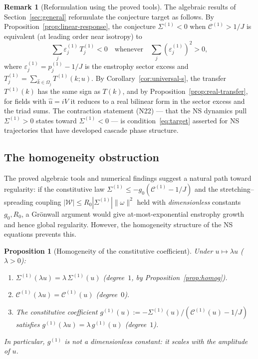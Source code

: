 \documentclass[11pt]{article}
\newtheorem{proposition}[theorem]{Proposition}
\theoremstyle{definition}
\newtheorem{remark}[theorem]{Remark}
\newcommand{\cC}{\mathcal{C}}
\begin{document}
\begin{remark}[Reformulation using the proved tools]
\label{rem:reformulation}
The algebraic results of Section~\ref{sec:general}
reformulate the conjecture target as follows.
By Proposition~\ref{prop:linear-response}, the
conjecture $\Sigma^{(1)}<0$ when $\cC^{(1)}>1/J$
is equivalent (at leading order near isotropy) to
\begin{equation}\label{eq:target}
\sum_j \varepsilon_j^{(1)}\, T_j^{(1)} < 0
\quad\text{whenever}\quad
\sum_j (\varepsilon_j^{(1)})^2 > 0,
\end{equation}
where $\varepsilon_j^{(1)} = p_j^{(1)}-1/J$ is
the enstrophy sector excess and
$T_j^{(1)} = \sum_{\hat k\in\Omega_j}
T^{(1)}(k;u)$.  By
Corollary~\ref{cor:universal-s}, the transfer
$T^{(1)}(k)$ has the same sign as $T(k)$, and
by Proposition~\ref{prop:real-transfer}, for
fields with $\hat u=iV$ it reduces to a real
bilinear form in the sector excess and the
triad sums.  The contraction statement (N22) ---
that the NS dynamics pull $\Sigma^{(1)}>0$ states
toward $\Sigma^{(1)}<0$ --- is
condition~\eqref{eq:target} asserted for NS
trajectories that have developed cascade phase
structure.
\end{remark}

\subsection{The homogeneity obstruction}
\label{sec:homogeneity}

The proved algebraic tools and numerical findings
suggest a natural path toward regularity:
if the constitutive law $\Sigma^{(1)}\leq
-g_0(\cC^{(1)}-1/J)$ and the stretching--spreading
coupling $|\mathcal{W}|\leq R_0|\Sigma^{(1)}|
\|\omega\|^2$ held with \emph{dimensionless}
constants $g_0,R_0$, a Gr\"onwall argument would
give at-most-exponential enstrophy growth and
hence global regularity.  However, the
homogeneity structure of the NS equations
prevents this.

\begin{proposition}[Homogeneity of the
constitutive coefficient]
\label{prop:homogeneity}
Under $u\mapsto\lambda u$ ($\lambda>0$):
\begin{enumerate}[leftmargin=2em,label=\textup{(\roman*)}]
\item $\Sigma^{(1)}(\lambda u) = \lambda\,\Sigma^{(1)}(u)$
  \textup{(}degree~$1$, by
  Proposition~\textup{\ref{prop:homog})}.
\item $\cC^{(1)}(\lambda u) = \cC^{(1)}(u)$
  \textup{(}degree~$0$\textup{)}.
\item The constitutive coefficient
  $g^{(1)}(u) := -\Sigma^{(1)}(u)/
  (\cC^{(1)}(u)-1/J)$ satisfies
  $g^{(1)}(\lambda u) = \lambda\,g^{(1)}(u)$
  \textup{(}degree~$1$\textup{)}.
\end{enumerate}
In particular, $g^{(1)}$ is not a dimensionless
constant: it scales with the amplitude of $u$.
\end{proposition}
\end{document}
